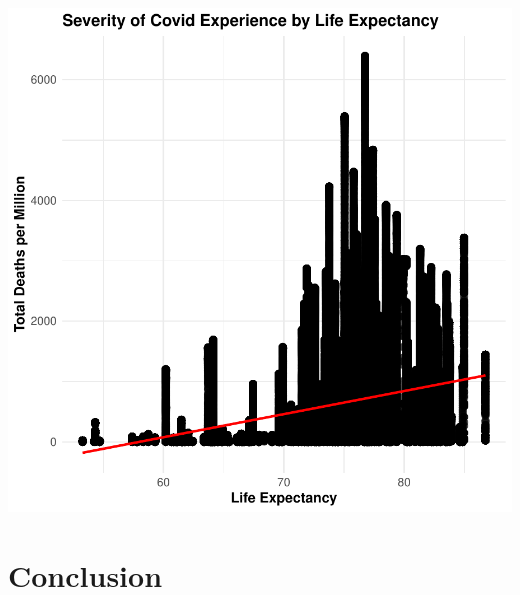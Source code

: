 \documentclass[12pt,preprint, authoryear]{elsarticle}
\let\origfigure\figure
\let\endorigfigure\endfigure
\renewenvironment{figure}[1][2] {
    \expandafter\origfigure\expandafter[H]
} {
    \endorigfigure
}
\numberwithin{equation}{section}
\numberwithin{figure}{section}
\numberwithin{table}{section}
\begin{document}
\begin{figure}

{\centering \includegraphics{Q1_files/figure-latex/Figure10-1} 

}

\caption{Life Expectancy \label{Figure10}}\label{fig:Figure10}
\end{figure}

\hypertarget{conclusion}{%
\section{Conclusion}\label{conclusion}}


\end{document}
